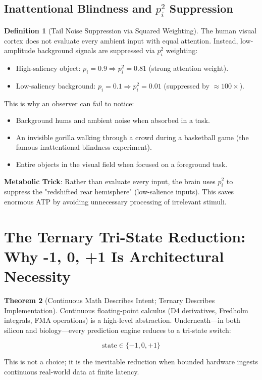 \documentclass[11pt,oneside]{article}
\theoremstyle{definition}
\newtheorem{theorem}{Theorem}
\newtheorem{definition}[theorem]{Definition}
\begin{document}
\subsection{Inattentional Blindness and $p_i^2$ Suppression}

\begin{definition}[Tail Noise Suppression via Squared Weighting]
The human visual cortex does not evaluate every ambient input with equal attention. Instead, low-amplitude background signals are suppressed via $p_i^2$ weighting:

\begin{itemize}
  \item High-saliency object: $p_i = 0.9 \Rightarrow p_i^2 = 0.81$ (strong attention weight).
  \item Low-saliency background: $p_i = 0.1 \Rightarrow p_i^2 = 0.01$ (suppressed by $\approx 100\times$).
\end{itemize}

This is why an observer can fail to notice:
\begin{itemize}
  \item Background hums and ambient noise when absorbed in a task.
  \item An invisible gorilla walking through a crowd during a basketball game (the famous inattentional blindness experiment).
  \item Entire objects in the visual field when focused on a foreground task.
\end{itemize}

\textbf{Metabolic Trick}: Rather than evaluate every input, the brain uses $p_i^2$ to suppress the "redshifted rear hemisphere" (low-salience inputs). This saves enormous ATP by avoiding unnecessary processing of irrelevant stimuli.
\end{definition}

\section{The Ternary Tri-State Reduction: Why {-1, 0, +1} Is Architectural Necessity}

\begin{theorem}[Continuous Math Describes Intent; Ternary Describes Implementation]
Continuous floating-point calculus (D4 derivatives, Fredholm integrals, FMA operations) is a high-level abstraction. Underneath—in both silicon and biology—every prediction engine reduces to a tri-state switch:

\[
\text{state} \in \{-1, 0, +1\}
\]

This is not a choice; it is the inevitable reduction when bounded hardware ingests continuous real-world data at finite latency.
\end{theorem}
\end{document}
